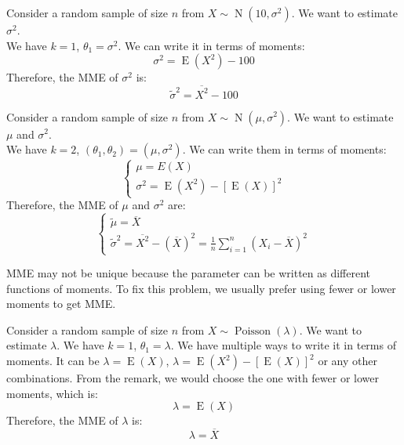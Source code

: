 \documentclass{huhtakm-template-book-v2}
\DeclareMathOperator{\E}{E}
\DeclareMathOperator{\Poisson}{Poisson}
\DeclareMathOperator{\N}{N}
\begin{document}
\newpage
\begin{eg}
	Consider a random sample of size $n$ from $X\sim\N(10,\sigma^{2})$. We want to estimate $\sigma^{2}$.\\
	We have $k=1$, $\theta_{1}=\sigma^{2}$. We can write it in terms of moments:
	\begin{equation*}
		\sigma^{2}=\E(X^{2})-100
	\end{equation*}
	Therefore, the MME of $\sigma^{2}$ is:
	\begin{equation*}
		\widetilde{\sigma}^{2}=\overline{X^{2}}-100
	\end{equation*}
\end{eg}
\begin{eg}
	Consider a random sample of size $n$ from $X\sim\N(\mu,\sigma^{2})$. We want to estimate $\mu$ and $\sigma^{2}$.\\
	We have $k=2$, $(\theta_{1},\theta_{2})=(\mu,\sigma^{2})$. We can write them in terms of moments: 
	\begin{equation*}
		\begin{cases}
			\mu=E(X)\\
			\sigma^{2}=\E(X^{2})-[\E(X)]^{2}
		\end{cases}
	\end{equation*}
	Therefore, the MME of $\mu$ and $\sigma^{2}$ are:
	\begin{equation*}
		\begin{cases}
			\widetilde{\mu}=\overline{X}\\
			\widetilde{\sigma}^{2}=\overline{X^{2}}-(\overline{X})^{2}=\frac{1}{n}\sum_{i=1}^{n}(X_{i}-\overline{X})^{2}
		\end{cases}
	\end{equation*}
\end{eg}
\begin{rem}
	MME may not be unique because the parameter can be written as different functions of moments. To fix this problem, we usually prefer using fewer or lower moments to get MME.
\end{rem}
\begin{eg}
	Consider a random sample of size $n$ from $X\sim\Poisson(\lambda)$. We want to estimate $\lambda$. We have $k=1$, $\theta_{1}=\lambda$. We have multiple ways to write it in terms of moments. It can be $\lambda=\E(X)$, $\lambda=\E(X^{2})-[\E(X)]^{2}$ or any other combinations. From the remark, we would choose the one with fewer or lower moments, which is:
	\begin{equation*}
		\lambda=\E(X)
	\end{equation*}
	Therefore, the MME of $\lambda$ is:
	\begin{equation*}
		\lambda=\overline{X}
	\end{equation*}
\end{eg}
\end{document}
